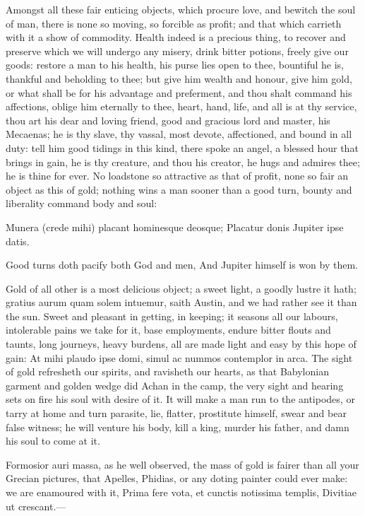 {Amongst all these fair enticing objects, which procure love, and
bewitch the soul of man, there is none so moving, so forcible as
profit; and that which carrieth with it a show of commodity. Health
indeed is a precious thing, to recover and preserve which we will
undergo any misery, drink bitter potions, freely give our goods:
restore a man to his health, his purse lies open to thee, bountiful he
is, thankful and beholding to thee; but give him wealth and honour,
give him gold, or what shall be for his advantage and preferment, and
thou shalt command his affections, oblige him eternally to thee, heart,
hand, life, and all is at thy service, thou art his dear and loving
friend, good and gracious lord and master, his Mecaenas; he is thy
slave, thy vassal, most devote, affectioned, and bound in all duty:
tell him good tidings in this kind, there spoke an angel, a blessed
hour that brings in gain, he is thy creature, and thou his creator, he
hugs and admires thee; he is thine for ever. No loadstone so attractive
as that of profit, none so fair an object as this of gold;
nothing wins a man sooner than a good turn, bounty and liberality
command body and soul:

Munera (crede mihi) placant hominesque deosque;
Placatur donis Jupiter ipse datis.

Good turns doth pacify both God and men,
And Jupiter himself is won by them.

Gold of all other is a most delicious object; a sweet light, a goodly
lustre it hath; gratius aurum quam solem intuemur, saith Austin, and we
had rather see it than the sun. Sweet and pleasant in getting, in
keeping; it seasons all our labours, intolerable pains we take for it,
base employments, endure bitter flouts and taunts, long journeys, heavy
burdens, all are made light and easy by this hope of gain: At mihi
plaudo ipse domi, simul ac nummos contemplor in arca. The sight of gold
refresheth our spirits, and ravisheth our hearts, as that Babylonian
garment and  golden wedge did Achan in the camp, the very sight
and hearing sets on fire his soul with desire of it. It will make a man
run to the antipodes, or tarry at home and turn parasite, lie, flatter,
prostitute himself, swear and bear false witness; he will venture his
body, kill a king, murder his father, and damn his soul to come at it.

Formosior auri massa, as  he well observed, the mass of gold is
fairer than all your Grecian pictures, that Apelles, Phidias, or any
doting painter could ever make: we are enamoured with it,
Prima fere vota, et cunctis notissima templis,
Divitiae ut crescant.---

}
